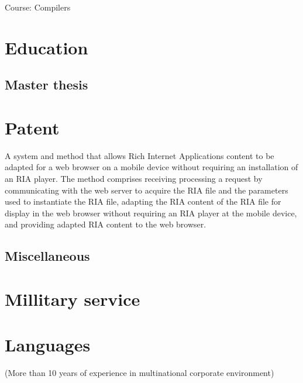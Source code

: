 \documentclass[10pt,a4paper]{moderncv}        %
\begin{document}
{Course: Compilers}


\section{Education}

\subsection{Master thesis}

\section{Patent}
{A system and method that allows Rich Internet Applications content
to be adapted for a web browser on a mobile device without requiring an installation of an RIA player.
The method comprises receiving processing a request by communicating with the web server to acquire the RIA file
and the parameters used to instantiate the RIA file,
adapting the RIA content of the RIA file for display in the web browser without requiring an RIA player at the mobile device,
and providing adapted RIA content to the web browser. }



\subsection{Miscellaneous}


\section{Millitary service}

\section{Languages}
{(More than 10 years of experience in multinational corporate environment)}
\end{document}
